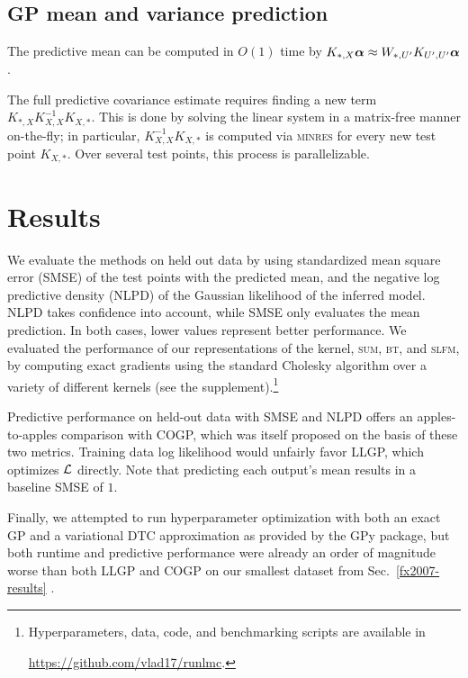 \documentclass[twoside]{article}
\newif\ifanonymized
\begin{document}
\subsection{GP mean and variance prediction}
    
The predictive mean can be computed in $O(1)$ time by $K_{*,X}{\boldsymbol\alpha}\approx W_{*,{U'}}K_{{U'},{U'}}{\boldsymbol\alpha}$ \citep{msgp}.

The full predictive covariance estimate requires finding a new term $K_{*,X}K_{X,X}^{-1}K_{X,*}$. This is done by solving the linear system in a matrix-free manner on-the-fly; in particular, $K_{X,X}^{-1}K_{X,*}$ is computed via \textsc{minres} for every new test point $K_{X,*}$. Over several test points, this process is parallelizable.

\section{Results}
\label{sec:results}
We evaluate the methods on held out data by using standardized mean square error (SMSE) of the test points with the predicted mean, and the negative log predictive density (NLPD) of the Gaussian likelihood of the inferred model. NLPD takes confidence into account, while SMSE only evaluates the mean prediction. In both cases, lower values represent better performance. We evaluated the performance of our representations of the kernel, \textsc{sum}, \textsc{bt}, and \textsc{slfm}, by computing exact gradients using the standard Cholesky algorithm over a variety of different kernels (see the supplement).\footnote{Hyperparameters, data, code, and benchmarking scripts are available in
  \ifanonymized
  \texttt{<anonymous repository>}.
  \else
  \url{https://github.com/vlad17/runlmc}.
  \fi
}

Predictive performance on held-out data with SMSE and NLPD offers an apples-to-apples comparison with COGP, which was itself proposed on the basis of these two metrics. Training data log likelihood would unfairly favor LLGP, which optimizes $\mathcal{L}$ directly. Note that predicting each output's mean results in a baseline SMSE of $1$.

Finally, we attempted to run hyperparameter optimization with both an exact GP and a variational DTC approximation as provided by the GPy package, but both runtime and predictive performance were already an order of magnitude worse than both LLGP and COGP on our smallest dataset from Sec.~\ref{fx2007-results} \citep{gpy2014}.
\end{document}
